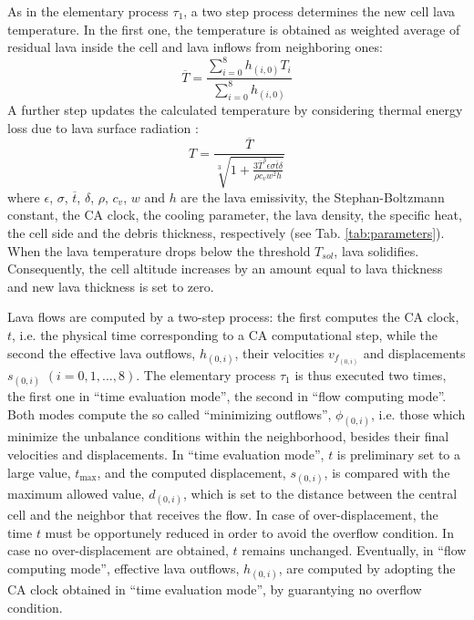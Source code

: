 As in the elementary process $\tau_1$, a two step process determines the new
cell lava temperature. In the first one, the temperature is obtained as weighted
average of residual lava inside the cell and lava inflows from neighboring ones:
$$
\overline{T} = \frac{ \sum_{i=0}^8 h_{(i,0)} T_i } { \sum_{i=0}^8 h_{(i,0)} }
$$ A further step updates the calculated temperature by considering thermal
energy loss due to lava surface radiation \cite{Park1984}:
$$ T = \frac{\overline{T}}  { \sqrt[3]{1 + \frac{3\overline{T}^3 \epsilon \sigma
\overline{t} \delta}{\rho c_v w^2 h}} } $$ where $\epsilon$, $\sigma$,
$\overline{t}$, $\delta$, $\rho$, $c_v$, $w$ and $h$ are the lava emissivity,
the Stephan-Boltzmann constant, the CA clock, the cooling parameter, the lava
density, the specific heat, the cell side and the debris thickness, respectively
(see Tab. \ref{tab:parameters}). When the lava temperature drops below the
threshold $T_{sol}$, lava solidifies. Consequently, the cell altitude increases
by an amount equal to lava thickness and new lava thickness is set to zero.

Lava flows are computed by a two-step process: the first computes the CA clock, $t$, i.e. the physical time corresponding to a CA computational step, while the second the effective lava outflows, $h_{(0,i)}$, their velocities $v_{f_{(0,i)}}$ and displacements $s_{(0,i)}$ $(i=0,1,...,8)$. The elementary process $\tau_1$ is thus executed two times, the first one in ``time evaluation mode'', the second in ``flow computing mode''. Both modes compute the so called ``minimizing outflows'', $\phi_{(0,i)}$, i.e. those which minimize the unbalance conditions within the neighborhood, besides their final velocities and displacements. In ``time evaluation mode'', $t$ is preliminary set to a large value, $t_{\max}$, and the computed displacement, $s_{(0,i)}$, is compared with the maximum allowed value, $d_{(0,i)}$, which is set to the distance between the central cell and the neighbor that receives the flow. In case of over-displacement, the time $t$ must be opportunely reduced in order to avoid the overflow condition. In case no over-displacement are obtained, $t$ remains unchanged. Eventually, in ``flow computing mode'', effective lava outflows, $h_{(0,i)}$, are computed by adopting the CA clock obtained in ``time evaluation mode'', by guarantying no overflow condition.

